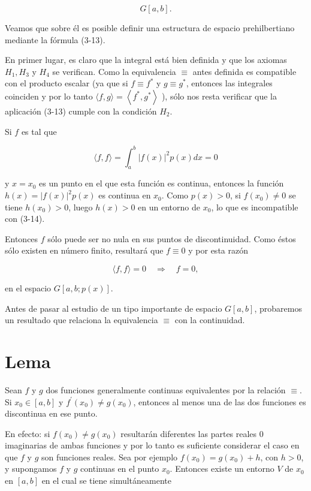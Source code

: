 \documentclass[10pt]{article}
\theoremstyle{plain}
\theoremstyle{definition}
\theoremstyle{remark}
\begin{document}
$$
G[a, b] .
$$

Veamos que sobre él es posible definir una estructura de espacio prehilbertiano mediante la fórmula (3-13).

En primer lugar, es claro que la integral está bien definida y que los axiomas $H_{1}, H_{3}$ y $H_{4}$ se verifican. Como la equivalencia $\equiv$ antes definida es compatible con el producto escalar (ya que si $f \equiv f^{*}$ y $g \equiv g^{*}$, entonces las integrales coinciden y por lo tanto $\langle f, g\rangle=\left\langle f^{*}, g^{*}\right\rangle$ ), sólo nos resta verificar que la aplicación (3-13) cumple con la condición $H_{2}$.

Si $f$ es tal que


\begin{equation*}
\langle f, f\rangle=\int_{a}^{b}|f(x)|^{2} p(x) d x=0 \tag{3-14}
\end{equation*}


y $x=x_{0}$ es un punto en el que esta función es continua, entonces la función $h(x)=|f(x)|^{2} p(x)$ es continua en $x_{0}$. Como $p(x)>0$, si $f\left(x_{0}\right) \neq 0$ se tiene $h\left(x_{0}\right)>0$, luego $h(x)>0$ en un entorno de $x_{0}$, lo que es incompatible con (3-14).

Entonces $f$ sólo puede ser no nula en sus puntos de discontinuidad. Como éstos sólo existen en número finito, resultará que $f \equiv 0$ y por esta razón

$$
\langle f, f\rangle=0 \quad \Rightarrow \quad f=0,
$$

en el espacio $G[a, b ; p(x)]$.


Antes de pasar al estudio de un tipo importante de espacio $G[a, b]$, probaremos un resultado que relaciona la equivalencia $\equiv$ con la continuidad.

\section*{Lema}
Sean $f$ y $g$ dos funciones generalmente continuas equivalentes por la relación $\equiv$. Si $x_{0} \in[a, b]$ y $f^{\prime}\left(x_{0}\right) \neq g\left(x_{0}\right)$, entonces al menos una de las dos funciones es discontinua en ese punto.

En efecto: si $f\left(x_{0}\right) \neq g\left(x_{0}\right)$ resultarán diferentes las partes reales 0 imaginarias de ambas funciones y por lo tanto es suficiente considerar el caso en que $f$ y $g$ son funciones reales. Sea por ejemplo $f\left(x_{0}\right)=g\left(x_{0}\right)+h$, con $h>0$, y supongamos $f$ y $g$ continuas en el punto $x_{0}$. Entonces existe un entorno $V$ de $x_{0}$ en $[a, b]$ en el cual se tiene simultáneamente
\end{document}
